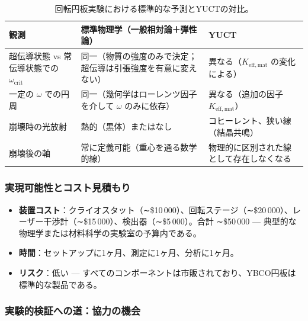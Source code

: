 \documentclass[12pt,a4paper]{article}
\begin{document}
	\begin{table}[h]
		\centering
		\caption{回転円板実験における標準的な予測とYUCTの対比。}
		\label{tab:experiment_predictions}
		\begin{tabular}{p{5cm}p{4cm}p{4cm}}
			\toprule
			\textbf{観測} & \textbf{標準物理学（一般相対論＋弾性論）} & \textbf{YUCT} \\
			\midrule
			超伝導状態 vs 常伝導状態での \(\omega_{\text{crit}}\) & 同一（物質の強度のみで決定；超伝導は引張強度を有意に変えない） & 異なる（\(K_{\mathrm{eff,mat}}\) の変化による） \\
			一定の \(\omega\) での円周 & 同一（幾何学はローレンツ因子を介して \(\omega\) のみに依存） & 異なる（追加の因子 \(K_{\mathrm{eff,mat}}\)） \\
			崩壊時の光放射 & 熱的（黒体）またはなし & コヒーレント、狭い線（結晶共鳴） \\
			崩壊後の軸 & 常に定義可能（重心を通る数学的線） & 物理的に区別された線として存在しなくなる \\
			\bottomrule
		\end{tabular}
	\end{table}
	
	\subsubsection{実現可能性とコスト見積もり}
	
	\begin{itemize}
		\item \textbf{装置コスト}：クライオスタット（∼\$10 000）、回転ステージ（∼\$20 000）、レーザー干渉計（∼\$15 000）、検出器（∼\$5 000）。合計 ∼\$50 000 — 典型的な物理学または材料科学の実験室の予算内である。
		\item \textbf{時間}：セットアップに1ヶ月、測定に1ヶ月、分析に1ヶ月。
		\item \textbf{リスク}：低い — すべてのコンポーネントは市販されており、YBCO円板は標準的な製品である。
	\end{itemize}
	
	\subsubsection{実験的検証への道：協力の機会}
	
\end{document}

